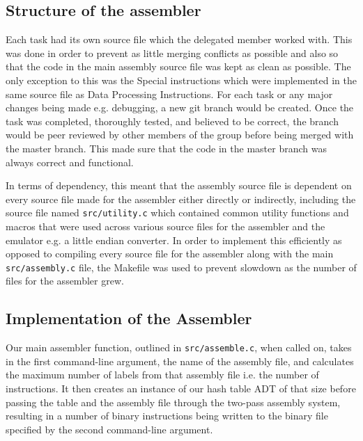 \documentclass[11pt]{article}
\begin{document}
\subsection{Structure of the assembler}
Each task had its own source file which the delegated member worked with. This was done in order to prevent as little merging conflicts as possible and also so that the code in the main assembly source file was kept as clean as possible. The only exception to this was the Special instructions which were implemented in the same source file as Data Processing Instructions. For each task or any major changes being made e.g. debugging, a new git branch would be created. Once the task was completed, thoroughly tested, and believed to be correct, the branch would be peer reviewed by other members of the group before being merged with the master branch. This made sure that the code in the master branch was always correct and functional.
\par
In terms of dependency, this meant that the assembly source file is dependent on every source file made for the assembler either directly or indirectly, including the source file named \texttt{src/utility.c} which contained common utility functions and macros that were used across various source files for the assembler and the emulator e.g. a little endian converter. In order to implement this efficiently as opposed to compiling every source file for the assembler along with the main \texttt{src/assembly.c} file, the Makefile was used to prevent slowdown as the number of files for the assembler grew.
\subsection{Implementation of the Assembler}
Our main assembler function, outlined in \texttt{src/assemble.c}, when called on, takes in the first command-line argument, the name of the assembly file, and calculates the maximum number of labels from that assembly file i.e. the number of instructions. It then creates an instance of our hash table ADT of that size before passing the table and the assembly file through the two-pass assembly system, resulting in a number of binary instructions being written to the binary file specified by the second command-line argument.
\end{document}
